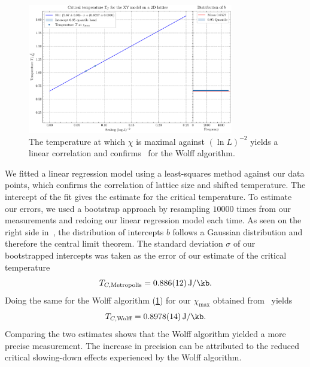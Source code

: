 		\begin{figure}[htbp]
			\centering
			\includegraphics[width=0.8\textwidth]{../figures/Wolff/Critical_Temperature.pdf}
						\caption[Estimating $T_C$ using the Wolff algorithm by plotting $T$ where $\chi$ is maximal against $(\ln L)^{-2}$]{The temperature at which $\chi$ is maximal against $(\ln L)^{-2}$ yields a linear correlation and confirms~ for the Wolff algorithm.}
			\label{fig:critical_temperature_wolf}
		\end{figure}
		
		We fitted a linear regression model using a least-squares method against our data points, which confirms the correlation of lattice size and shifted temperature. The intercept of the fit gives the estimate for the critical temperature. To estimate our errors, we used a bootstrap approach by resampling $\num{10 000}$ times from our measurements and redoing our linear regression model each time. As seen on the right side in~, the distribution of intercepts $b$ follows a Gaussian distribution and therefore the central limit theorem. The standard deviation $\sigma$ of our bootstrapped intercepts was taken as the error of our estimate of the critical temperature
		\begin{equation}
			T_{C, \text{Metropolis}} = \SI{0.886(12)}{\J\per\kb}.
		\end{equation}
		Doing the same for the Wolff algorithm (\cref{fig:critical_temperature_wolf}) for our $\chi_\text{max}$ obtained from~ yields
		\begin{equation}
			T_{C, \text{Wolff}} = \SI{0.8978(14)}{\J\per\kb}.
		\end{equation}
		Comparing the two estimates shows that the Wolff algorithm yielded a more precise measurement. The increase in precision can be attributed to the reduced critical slowing-down effects experienced by the Wolff algorithm.
		
